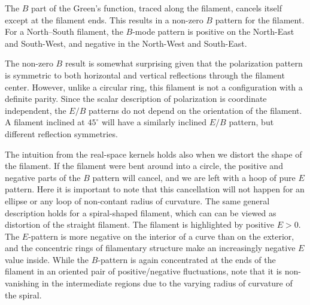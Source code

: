 The $B$ part of the Green's function, traced along the filament, cancels itself except at the filament ends.  This results in a non-zero $B$ pattern for the filament.  For a North--South filament, the $B$-mode pattern is positive on the North-East and South-West, and negative in the North-West and South-East.

The non-zero $B$ result is somewhat surprising given that the polarization pattern is symmetric to both horizontal and vertical reflections through the filament center.  However, unlike a circular ring, this filament is not a configuration with a definite parity.  Since the scalar description of polarization is coordinate independent, the $E/B$ patterns do not depend on the orientation of the filament.  A filament inclined at $45^\circ$ will have a similarly inclined $E/B$ pattern, but different reflection symmetries.  

The intuition from the real-space kernels holds also when we distort the shape of the filament.  If the filament were bent around into a circle, the positive and negative parts of the $B$ pattern will cancel, and we are left with a hoop of pure $E$ pattern. Here it is important to note that this cancellation will not happen for an ellipse or any loop of non-contant radius of curvature.  The same general description holds for a spiral-shaped filament, which can can be viewed as distortion of the straight filament.  The filament is highlighted by positive $E>0$.  The $E$-pattern is more negative on the interior of a curve than on the exterior, and the concentric rings of filamentary structure make an increasingly negative $E$ value inside. While the $B$-pattern is again concentrated at the ends of the filament in an oriented pair of positive/negative fluctuations, note that it is non-vanishing in the intermediate regions due to the varying radius of curvature of the spiral.



